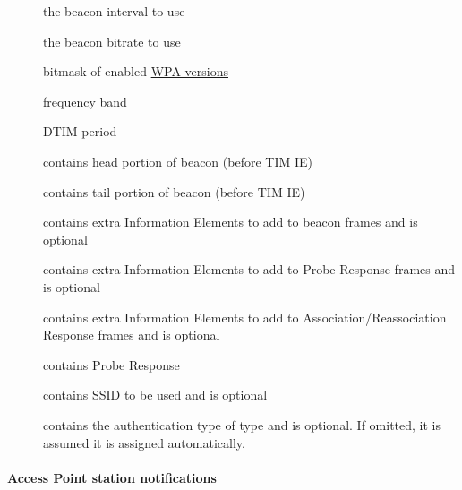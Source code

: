 \begin{description}
\item[] %
\item[] the beacon interval to use
\item[] the beacon bitrate to use
\item[] bitmask of enabled \hyperref[def:Device Types / 802.11 Device / Device Operation / Common Definitions / Interface Types / WPA versions]{WPA versions}
\item[] frequency band
\item[] DTIM period
\item[] %
\item[] %
\item[] %
\item[] %
\item[] %
\item[] contains head portion of beacon (before TIM IE)
\item[] contains tail portion of beacon (before TIM IE)
\item[] contains extra Information Elements to add to beacon frames and is optional
\item[] contains extra Information Elements to add to Probe Response frames and is optional
\item[] contains extra Information Elements to add to Association/Reassociation Response frames and is optional
\item[] contains Probe Response
\item[] contains SSID to be used and is optional
\item[] contains the authentication type of type \hyperref[def:Device Types / 802.11 Device / Device Operation / Common Definitions / Interface Types / enum virtio_wifi_auth_type]{} and is optional. If omitted, it is assumed it is assigned automatically.
\end{description}

\paragraph{Access Point station notifications}\label{sec:Device Types / 802.11 Device / Device Operation / Access Point Management / Access Point station notifications}

